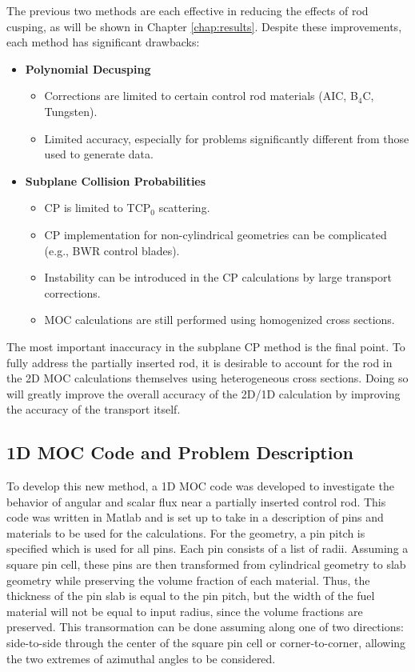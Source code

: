 The previous two methods are each effective in reducing the effects of rod cusping, as will be shown in Chapter \ref{chap:results}.  Despite these improvements, each method has significant drawbacks:
\begin{itemize}[leftmargin=*]
    \item \textbf{Polynomial Decusping}
    
    \begin{itemize}
        \item Corrections are limited to certain control rod materials (AIC, B$_4$C, Tungsten).
        \item Limited accuracy, especially for problems significantly different from those used to generate data.
    \end{itemize}

    \item \textbf{Subplane Collision Probabilities}
    
    \begin{itemize}
        \item CP is limited to TCP$_0$ scattering.
        \item CP implementation for non-cylindrical geometries can be complicated (e.g., BWR control blades).
        \item Instability can be introduced in the CP calculations by large transport corrections.
        \item MOC calculations are still performed using homogenized cross sections.
    \end{itemize}
\end{itemize}
The most important inaccuracy in the subplane CP method is the final point.  To fully address the partially inserted rod, it is desirable to account for the rod in the 2D MOC calculations themselves using heterogeneous cross sections.  Doing so will greatly improve the overall accuracy of the 2D/1D calculation by improving the accuracy of the transport itself.

\subsection{1D MOC Code and Problem Description}\label{ss:1dcode}

To develop this new method, a 1D MOC code was developed to investigate the behavior of angular and scalar flux near a partially inserted control rod.  This code was written in Matlab \cite{MATLAB:2016} and is set up to take in a description of pins and materials to be used for the calculations.  For the geometry, a pin pitch is specified which is used for all pins.  Each pin consists of a list of radii.  Assuming a square pin cell, these pins are then transformed from cylindrical geometry to slab geometry while preserving the volume fraction of each material.  Thus, the thickness of the pin slab is equal to the pin pitch, but the width of the fuel material will not be equal to input radius, since the volume fractions are preserved.  This transormation can be done assuming along one of two directions: side-to-side through the center of the square pin cell or corner-to-corner, allowing the two extremes of azimuthal angles to be considered.


